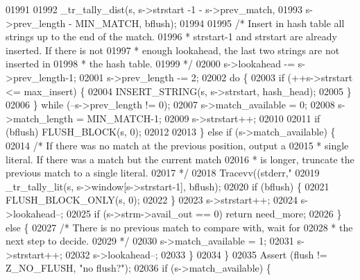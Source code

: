 \begin{DoxyCode}
{{{{{{01991 
01992             \_tr\_tally\_dist(s, s->strstart -1 - s->prev\_match,
01993                            s->prev\_length - MIN\_MATCH, bflush);
01994 
01995             \textcolor{comment}{/* Insert in hash table all strings up to the end of the match.}
01996 \textcolor{comment}{             * strstart-1 and strstart are already inserted. If there is not}
01997 \textcolor{comment}{             * enough lookahead, the last two strings are not inserted in}
01998 \textcolor{comment}{             * the hash table.}
01999 \textcolor{comment}{             */}
02000             s->lookahead -= s->prev\_length-1;
02001             s->prev\_length -= 2;
02002             \textcolor{keywordflow}{do} \{
02003                 \textcolor{keywordflow}{if} (++s->strstart <= max\_insert) \{
02004                     INSERT\_STRING(s, s->strstart, hash\_head);
02005                 \}
02006             \} \textcolor{keywordflow}{while} (--s->prev\_length != 0);
02007             s->match\_available = 0;
02008             s->match\_length = MIN\_MATCH-1;
02009             s->strstart++;
02010 
02011             \textcolor{keywordflow}{if} (bflush) FLUSH\_BLOCK(s, 0);
02012 
02013         \} \textcolor{keywordflow}{else} \textcolor{keywordflow}{if} (s->match\_available) \{
02014             \textcolor{comment}{/* If there was no match at the previous position, output a}
02015 \textcolor{comment}{             * single literal. If there was a match but the current match}
02016 \textcolor{comment}{             * is longer, truncate the previous match to a single literal.}
02017 \textcolor{comment}{             */}
02018             Tracevv((stderr,\textcolor{stringliteral}{"%
02019             \_tr\_tally\_lit(s, s->window[s->strstart-1], bflush);
02020             \textcolor{keywordflow}{if} (bflush) \{
02021                 FLUSH\_BLOCK\_ONLY(s, 0);
02022             \}
02023             s->strstart++;
02024             s->lookahead--;
02025             \textcolor{keywordflow}{if} (s->strm->avail\_out == 0) \textcolor{keywordflow}{return} need\_more;
02026         \} \textcolor{keywordflow}{else} \{
02027             \textcolor{comment}{/* There is no previous match to compare with, wait for}
02028 \textcolor{comment}{             * the next step to decide.}
02029 \textcolor{comment}{             */}
02030             s->match\_available = 1;
02031             s->strstart++;
02032             s->lookahead--;
02033         \}
02034     \}
02035     Assert (flush != Z\_NO\_FLUSH, \textcolor{stringliteral}{"no flush?"});
02036     \textcolor{keywordflow}{if} (s->match\_available) \{
}}}}}}}
\end{DoxyCode}
